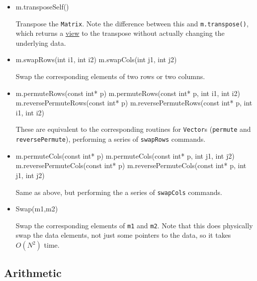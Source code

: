 \documentclass[twoside,letterpaper,11pt]{article}
\renewcommand{\tt}[1]{{\lstinline {#1}}}
\begin{document}
\begin{itemize}
\item
\begin{tmvcode}
m.transposeSelf()
\end{tmvcode}
Transpose the \tt{Matrix}.  Note the difference between this and 
\tt{m.transpose()}, which returns a \underline{view} to the transpose without 
actually changing the underlying data.

\item
\begin{tmvcode}
m.swapRows(int i1, int i2)
m.swapCols(int j1, int j2)
\end{tmvcode}
Swap the corresponding elements of two rows or two columns.

\item
\begin{tmvcode}
m.permuteRows(const int* p)
m.permuteRows(const int* p, int i1, int i2)
m.reversePermuteRows(const int* p)
m.reversePermuteRows(const int* p, int i1, int i2)
\end{tmvcode}
These are equivalent to the corresponding routines for \tt{Vector}s 
(\tt{permute} and \tt{reversePermute}), performing a series of \tt{swapRows} commands.

\item
\begin{tmvcode}
m.permuteCols(const int* p)
m.permuteCols(const int* p, int j1, int j2)
m.reversePermuteCols(const int* p)
m.reversePermuteCols(const int* p, int j1, int j2)
\end{tmvcode}
Same as above, but performing the a series of \tt{swapCols} commands.

\item
\begin{tmvcode}
Swap(m1,m2)
\end{tmvcode}
Swap the corresponding elements of \tt{m1} and \tt{m2}.  Note that this does physically
swap the data elements, not just some pointers to the data, so it takes $O(N^2)$ time.

\end{itemize}

\subsection{Arithmetic}
\label{Matrix_Arithmetic}
\end{document}
